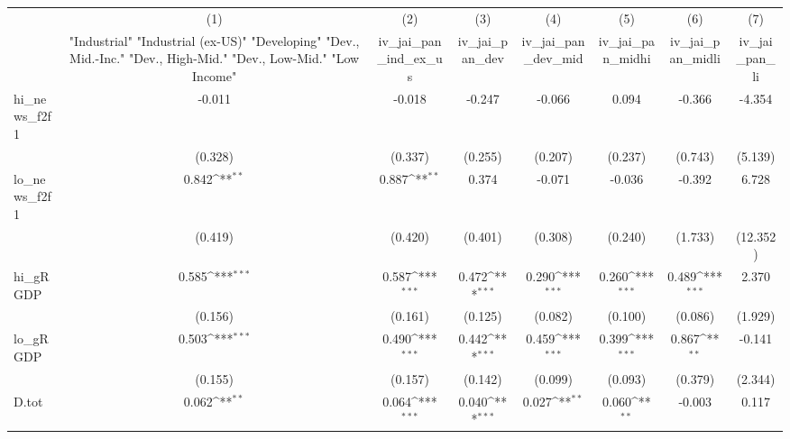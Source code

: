 {
\def\sym#1{\ifmmode^{#1}\else\(^{#1}\)\fi}
\begin{tabular}{l*{7}{c}}
\toprule
            &\multicolumn{1}{c}{(1)}&\multicolumn{1}{c}{(2)}&\multicolumn{1}{c}{(3)}&\multicolumn{1}{c}{(4)}&\multicolumn{1}{c}{(5)}&\multicolumn{1}{c}{(6)}&\multicolumn{1}{c}{(7)}\\
            &\multicolumn{1}{c}{ "Industrial" "Industrial (ex-US)" "Developing" "Dev., Mid.-Inc." "Dev., High-Mid."  "Dev., Low-Mid." "Low Income" }&\multicolumn{1}{c}{iv\_jai\_pan\_ind\_ex\_us}&\multicolumn{1}{c}{iv\_jai\_pan\_dev}&\multicolumn{1}{c}{iv\_jai\_pan\_dev\_mid}&\multicolumn{1}{c}{iv\_jai\_pan\_midhi}&\multicolumn{1}{c}{iv\_jai\_pan\_midli}&\multicolumn{1}{c}{iv\_jai\_pan\_li}\\
\midrule
hi\_news\_f2f1&      -0.011         &      -0.018         &      -0.247         &      -0.066         &       0.094         &      -0.366         &      -4.354         \\
            &     (0.328)         &     (0.337)         &     (0.255)         &     (0.207)         &     (0.237)         &     (0.743)         &     (5.139)         \\
\addlinespace
lo\_news\_f2f1&       0.842\sym{**} &       0.887\sym{**} &       0.374         &      -0.071         &      -0.036         &      -0.392         &       6.728         \\
            &     (0.419)         &     (0.420)         &     (0.401)         &     (0.308)         &     (0.240)         &     (1.733)         &    (12.352)         \\
\addlinespace
hi\_gRGDP    &       0.585\sym{***}&       0.587\sym{***}&       0.472\sym{***}&       0.290\sym{***}&       0.260\sym{***}&       0.489\sym{***}&       2.370         \\
            &     (0.156)         &     (0.161)         &     (0.125)         &     (0.082)         &     (0.100)         &     (0.086)         &     (1.929)         \\
\addlinespace
lo\_gRGDP    &       0.503\sym{***}&       0.490\sym{***}&       0.442\sym{***}&       0.459\sym{***}&       0.399\sym{***}&       0.867\sym{**} &      -0.141         \\
            &     (0.155)         &     (0.157)         &     (0.142)         &     (0.099)         &     (0.093)         &     (0.379)         &     (2.344)         \\
\addlinespace
D.tot       &       0.062\sym{**} &       0.064\sym{***}&       0.040\sym{***}&       0.027\sym{**} &       0.060\sym{**} &      -0.003         &       0.117         \\

\end{tabular}}

